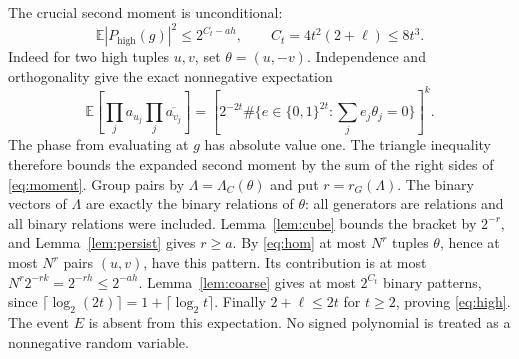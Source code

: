 \documentclass[11pt]{amsart}
\theoremstyle{remark}
\newcommand{\E}{\mathbb E}
\newcommand{\hi}{P_{\mathrm{high}}}
\newcommand{\LC}{\Lambda_C}
\begin{document}
The crucial second moment is unconditional:
\begin{equation}\label{eq:high}
 \E|\hi(g)|^2\le2^{C_t-ah},\qquad
 C_t=4t^2(2+\ell)\le8t^3.
\end{equation}
Indeed for two high tuples $u,v$, set $\theta=(u,-v)$. Independence
and orthogonality give the exact nonnegative expectation
\begin{equation}\label{eq:moment}
 \E\left[\prod_ja_{u_j}\prod_j\overline{a_{v_j}}\right]
 =\left[2^{-2t}\#\{e\in\{0,1\}^{2t}:\sum_je_j\theta_j=0\}\right]^k.
\end{equation}
The phase from evaluating at $g$ has absolute value one. The triangle
inequality therefore bounds the expanded second moment by the sum of
the right sides of \eqref{eq:moment}. Group pairs by
$\Lambda=\LC(\theta)$ and put $r=r_G(\Lambda)$. The binary vectors
of $\Lambda$ are exactly the binary relations of $\theta$: all
generators are relations and all binary relations were included.
Lemma~\ref{lem:cube} bounds the bracket by $2^{-r}$, and
Lemma~\ref{lem:persist} gives $r\ge a$. By \eqref{eq:hom} at most
$N^r$ tuples $\theta$, hence at most $N^r$ pairs $(u,v)$, have this
pattern. Its contribution is at most
$N^r2^{-rk}=2^{-rh}\le2^{-ah}$. Lemma~\ref{lem:coarse} gives at
most $2^{C_t}$ binary patterns, since
$\lceil\log_2(2t)\rceil=1+\lceil\log_2t\rceil$. Finally
$2+\ell\le2t$ for $t\ge2$, proving \eqref{eq:high}.
The event $E$ is absent from this expectation. No signed polynomial
is treated as a nonnegative random variable.
\end{document}
